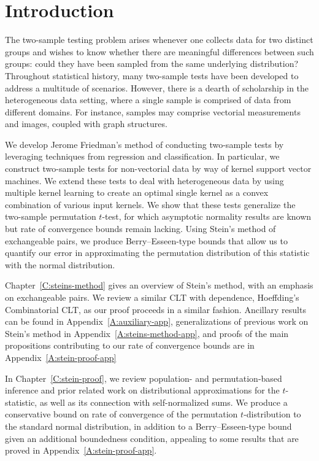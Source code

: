 \chapter{Introduction}

The two-sample testing problem arises whenever one collects data for
two distinct groups and wishes to know whether there are meaningful
differences between such groups: could they have been sampled from the
same underlying distribution?  Throughout statistical history, many
two-sample tests have been developed to address a multitude of
scenarios.  However, there is a dearth of scholarship in the
heterogeneous data setting, where a single sample is comprised of data
from different domains.  For instance, samples may comprise vectorial
measurements and images, coupled with graph structures.

We develop Jerome Friedman's method of conducting two-sample tests
by leveraging techniques from regression and classification.  In
particular, we construct two-sample tests for non-vectorial data by
way of kernel support vector machines.  We extend these tests to deal
with heterogeneous data by using multiple kernel learning to create
an optimal single kernel as a convex combination of various input
kernels.  We show that these tests generalize the two-sample permutation
$t$-test, for which asymptotic normality results are known but rate of
convergence bounds remain lacking.  Using Stein's method of
exchangeable pairs, we produce Berry--Esseen-type bounds that allow us
to quantify our error in approximating the permutation distribution
of this statistic with the normal distribution.

Chapter~\ref{C:steins-method} gives an overview of Stein's method,
with an emphasis on exchangeable pairs.  We review a similar CLT with
dependence, Hoeffding's Combinatorial CLT, as our proof proceeds in a
similar fashion.  Ancillary results can be found in
Appendix~\ref{A:auxiliary-app}, generalizations of previous work on
Stein's method in Appendix~\ref{A:steins-method-app}, and proofs of
the main propositions contributing to our rate of convergence bounds
are in Appendix~\ref{A:stein-proof-app}

In Chapter~\ref{C:stein-proof}, we review population- and
permutation-based inference and prior related work on distributional
approximations for the $t$-statistic, as well as its connection with
self-normalized sums.  We produce a conservative bound on rate of
convergence of the permutation $t$-distribution to the standard normal
distribution, in addition to a Berry--Esseen-type bound given an
additional boundedness condition, appealing to some results that are
proved in Appendix~\ref{A:stein-proof-app}.

